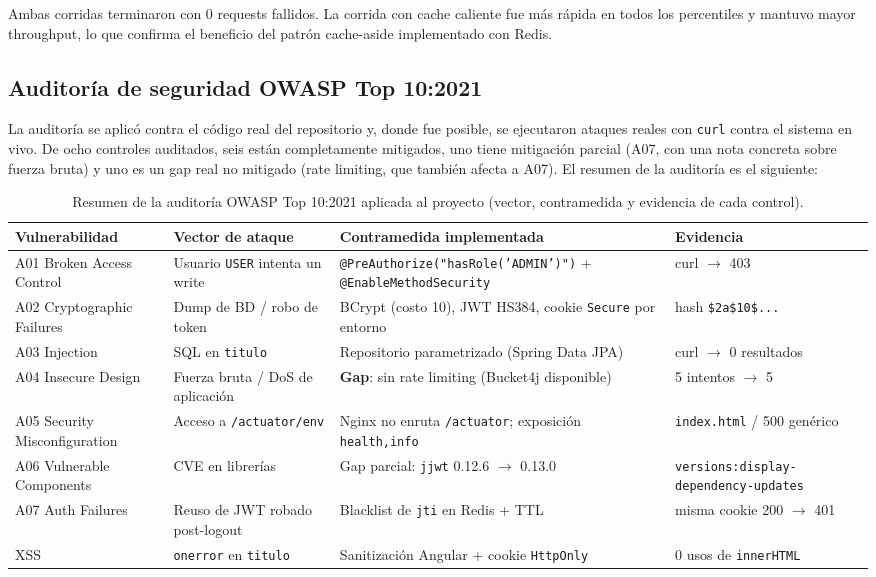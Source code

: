 \documentclass[12pt,a4paper]{article}
\begin{document}
Ambas corridas terminaron con 0 requests fallidos. La corrida con cache caliente fue más
rápida en todos los percentiles y mantuvo mayor throughput, lo que confirma el beneficio
del patrón cache-aside implementado con Redis.

\subsection{Auditoría de seguridad OWASP Top 10:2021}

La auditoría se aplicó contra el código real del repositorio y, donde fue posible, se
ejecutaron ataques reales con \texttt{curl} contra el sistema en vivo. De ocho controles
auditados, seis están completamente mitigados, uno tiene mitigación parcial (A07, con
una nota concreta sobre fuerza bruta) y uno es un gap real no mitigado (rate limiting,
que también afecta a A07). El resumen de la auditoría es el siguiente:

\begin{table}[H]
\centering
\caption{Resumen de la auditoría OWASP Top 10:2021 aplicada al proyecto (vector, contramedida y evidencia de cada control).}
\label{tab:owasp}
\footnotesize
\setlength{\tabcolsep}{4pt}
\renewcommand{\arraystretch}{1.3}
\begin{tabularx}{\textwidth}{lXXl}
\toprule
Vulnerabilidad & Vector de ataque & Contramedida implementada & Evidencia \\
\midrule
A01 Broken Access Control & Usuario \texttt{USER} intenta un write & \texttt{@PreAuthorize("hasRole('ADMIN')")} + \texttt{@EnableMethodSecurity} & curl $\rightarrow$ 403 \\
A02 Cryptographic Failures & Dump de BD / robo de token & BCrypt (costo 10), JWT HS384, cookie \texttt{Secure} por entorno & hash \texttt{\$2a\$10\$...} \\
A03 Injection & SQL en \texttt{titulo} & Repositorio parametrizado (Spring Data JPA) & curl $\rightarrow$ 0 resultados \\
A04 Insecure Design & Fuerza bruta / DoS de aplicación & \textbf{Gap}: sin rate limiting (Bucket4j disponible) & 5 intentos $\rightarrow$ 5\texttimes 401 \\
A05 Security Misconfiguration & Acceso a \texttt{/actuator/env} & Nginx no enruta \texttt{/actuator}; exposición \texttt{health,info} & \texttt{index.html} / 500 genérico \\
A06 Vulnerable Components & CVE en librerías & Gap parcial: \texttt{jjwt} 0.12.6 $\rightarrow$ 0.13.0 & \texttt{versions:display-dependency-updates} \\
A07 Auth Failures & Reuso de JWT robado post-logout & Blacklist de \texttt{jti} en Redis + TTL & misma cookie 200 $\rightarrow$ 401 \\
XSS & \texttt{onerror} en \texttt{titulo} & Sanitización Angular + cookie \texttt{HttpOnly} & 0 usos de \texttt{innerHTML} \\
\bottomrule
\end{tabularx}
\end{table}
\end{document}
